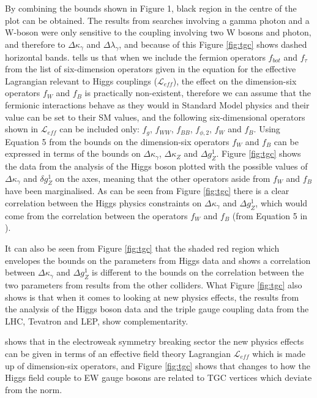 \documentclass[11pt,oneside,a4paper]{article}
\begin{document}
By combining the bounds shown in Figure 1, black region in the centre of the plot can be obtained. The results from searches involving a gamma photon and a W-boson were only sensitive to the coupling involving two W bosons and photon, and therefore to $\Delta\kappa_{\gamma}$ and $\Delta\lambda_{\gamma}$, and because of this Figure \ref{fig:tgc} shows dashed horizontal bands. \cite{higgsfermion} tells us that when we include the fermion operators ${f}_{bot}$ and ${f}_{\tau}$ from the list of six-dimension operators given in the equation for the effective Lagrangian relevant to Higgs couplings ($\mathcal{L}_{eff}$), the effect on the dimension-six operators ${f}_{W}$ and ${f}_{B}$ is practically non-existent, therefore we can assume that the fermionic interactions behave as they would in Standard Model physics and their value can be set to their SM values, and the following six-dimensional operators shown in $\mathcal{L}_{eff}$ can be included only: ${f}_{g}$, ${f}_{WW}$, ${f}_{BB}$, ${f}_{\phi,2}$, ${f}_{W}$ and ${f}_{B}$. Using Equation 5 from \cite{higgsdata} the bounds on the dimension-six operators ${f}_{W}$ and ${f}_{B}$ can be expressed in terms of the bounds on $\Delta\kappa_{\gamma}$, $\Delta\kappa_{Z}$ and $\Delta g_{Z}^{1}$. Figure \ref{fig:tgc} shows the data from the analysis of the Higgs boson plotted with the possible values of $\Delta\kappa_{\gamma}$ and $\delta g_{Z}^{1}$ on the axes, meaning that the other operators aside from ${f}_{W}$ and ${f}_{B}$ have been marginalised. As can be seen from Figure \ref{fig:tgc} there is a clear correlation between the Higgs physics constraints on $\Delta\kappa_{\gamma}$ and $\Delta g_{Z}^{1}$, which would come from the correlation between the operators ${f}_{W}$ and ${f}_{B}$ (from Equation 5 in \cite{higgsdata}).

It can also be seen from Figure \ref{fig:tgc} that the shaded red region which envelopes the bounds on the parameters from Higgs data and shows a correlation between $\Delta\kappa_{\gamma}$ and $\Delta g_{Z}^{1}$ is different to the bounds on the correlation between the two parameters from results from the other colliders. What Figure \ref{fig:tgc} also shows is that when it comes to looking at new physics effects, the results from the analysis of the Higgs boson data and the  triple gauge coupling data from the LHC, Tevatron and LEP, show complementarity. 


\cite{higgsdata} shows that in the electroweak symmetry breaking sector the new physics effects can be given in terms of an effective field theory Lagrangian $\mathcal{L}_{eff}$ which is made up of dimension-six operators, and Figure \ref{fig:tgc} shows that changes to how the Higgs field couple to EW gauge bosons are related to TGC vertices which deviate from the norm.
\end{document}
